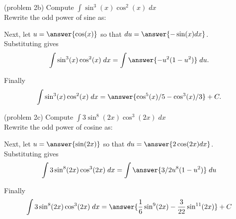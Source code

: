 \documentclass{ximera}
\begin{document}
\begin{problem}{\color{gray}(problem 2b)} 
Compute $\displaystyle{\int \sin^3(x)\cos^2(x) \; dx}$\\

Rewrite the odd power of sine as:

\begin{multipleChoice}
\end{multipleChoice}

Next, let $u = \answer{\cos(x)}$ so that $du = \answer{-\sin(x) dx}$.\\

Substituting gives
\[
\int \sin^3(x)\cos^2(x) \; dx= \int \answer{-u^2(1-u^2)} \; du.
\]

Finally
\[
\int \sin^3(x)\cos^2(x) \; dx= \answer{\cos^5(x)/5 - \cos^3(x)/3} + C.
\]

\end{problem}



\begin{problem}{\color{gray}(problem 2c)}
Compute $\displaystyle{\int 3\sin^8(2x)\cos^3(2x) \; dx}$\\

Rewrite the odd power of cosine as:

\begin{multipleChoice}
\end{multipleChoice}

Next, let $u = \answer{\sin(2x)}$ so that $du = \answer{2\cos(2x) dx}$.\\

Substituting gives
\[
\int 3\sin^8(2x)\cos^3(2x) \; dx= \int \answer{3/2 u^8(1-u^2)} \; du
\]

Finally
\[
\int 3\sin^8(2x)\cos^3(2x) \; dx= \answer{\frac16 \sin^9(2x)- \frac{3}{22} \sin^{11}(2x)} + C
\]
\end{problem}
\end{document}
